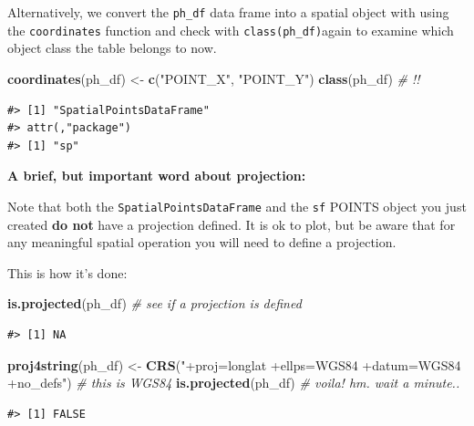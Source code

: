 \documentclass[]{book}
\newenvironment{Shaded}{\begin{snugshade}}{\end{snugshade}}
\newcommand{\KeywordTok}[1]{\textcolor[rgb]{0.13,0.29,0.53}{\textbf{#1}}}
\newcommand{\StringTok}[1]{\textcolor[rgb]{0.31,0.60,0.02}{#1}}
\newcommand{\CommentTok}[1]{\textcolor[rgb]{0.56,0.35,0.01}{\textit{#1}}}
\newcommand{\NormalTok}[1]{#1}
\theoremstyle{definition}
\theoremstyle{definition}
\theoremstyle{definition}
\theoremstyle{remark}
\begin{document}
Alternatively, we convert the \texttt{ph\_df} data frame into a spatial
object with using the \texttt{coordinates} function and check with
\texttt{class(ph\_df)}again to examine which object class the table
belongs to now.

\begin{Shaded}
\begin{Highlighting}[]
\KeywordTok{coordinates}\NormalTok{(ph_df) <-}\StringTok{ }\KeywordTok{c}\NormalTok{(}\StringTok{"POINT_X"}\NormalTok{, }\StringTok{"POINT_Y"}\NormalTok{)}
\KeywordTok{class}\NormalTok{(ph_df) }\CommentTok{# !!}
\end{Highlighting}
\end{Shaded}

\begin{verbatim}
#> [1] "SpatialPointsDataFrame"
#> attr(,"package")
#> [1] "sp"
\end{verbatim}

\textbf{A brief, but important word about projection:}

Note that both the \texttt{SpatialPointsDataFrame} and the \texttt{sf}
POINTS object you just created \textbf{do not} have a projection
defined. It is ok to plot, but be aware that for any meaningful spatial
operation you will need to define a projection.

This is how it's done:

\begin{Shaded}
\begin{Highlighting}[]
\KeywordTok{is.projected}\NormalTok{(ph_df) }\CommentTok{# see if a projection is defined  }
\end{Highlighting}
\end{Shaded}

\begin{verbatim}
#> [1] NA
\end{verbatim}

\begin{Shaded}
\begin{Highlighting}[]
\KeywordTok{proj4string}\NormalTok{(ph_df) <-}\StringTok{ }\KeywordTok{CRS}\NormalTok{(}\StringTok{"+proj=longlat +ellps=WGS84 +datum=WGS84 +no_defs"}\NormalTok{) }\CommentTok{# this is WGS84}
\KeywordTok{is.projected}\NormalTok{(ph_df) }\CommentTok{# voila! hm. wait a minute..}
\end{Highlighting}
\end{Shaded}

\begin{verbatim}
#> [1] FALSE
\end{verbatim}
\end{document}
